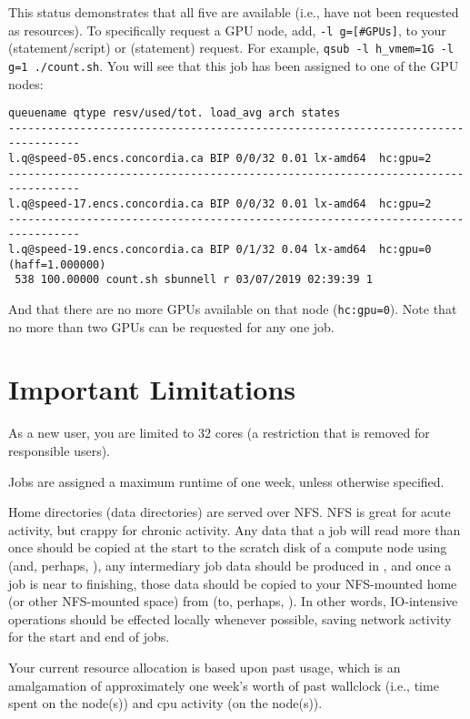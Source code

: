 \documentclass{easychair}
\begin{document}
This status demonstrates that all five are available (i.e., have not been requested as resources). To specifically request a GPU node, add, \texttt{-l g=[\#GPUs]}, to your  (statement/script) or  (statement) request. For example, \texttt{qsub -l h\_vmem=1G -l g=1 ./count.sh}. You will see that this job has been assigned to one of the GPU nodes:

\small
\begin{verbatim}
queuename qtype resv/used/tot. load_avg arch states 
--------------------------------------------------------------------------------- 
l.q@speed-05.encs.concordia.ca BIP 0/0/32 0.01 lx-amd64  hc:gpu=2 
--------------------------------------------------------------------------------- 
l.q@speed-17.encs.concordia.ca BIP 0/0/32 0.01 lx-amd64  hc:gpu=2 
--------------------------------------------------------------------------------- 
l.q@speed-19.encs.concordia.ca BIP 0/1/32 0.04 lx-amd64  hc:gpu=0 (haff=1.000000) 
 538 100.00000 count.sh sbunnell r 03/07/2019 02:39:39 1
\end{verbatim}
\normalsize

And that there are no more GPUs available on that node (\texttt{hc:gpu=0}). Note that no 
more than two GPUs can be requested for any one job. 

\section{Important Limitations}

As a new user, you are limited to 32 cores (a restriction that is removed for responsible users).

Jobs are assigned a maximum runtime of one week, unless otherwise specified. 

Home directories (data directories) are served over NFS. NFS is great for acute  activity, but crappy for chronic activity. Any data that a job will read more than once should be copied at the start to the scratch disk of a compute node using  (and, perhaps, ), any intermediary job data should be produced in , and once a job is near to finishing, those data should be copied to your NFS-mounted home (or other NFS-mounted space) from  (to, perhaps, ). In other words, IO-intensive operations should be effected locally whenever possible, saving network activity for the start and end of jobs. 

Your current resource allocation is based upon past usage, which is an amalgamation of approximately one week's worth of past wallclock (i.e., time spent on the node(s)) and cpu activity (on the node(s)).
\end{document}
